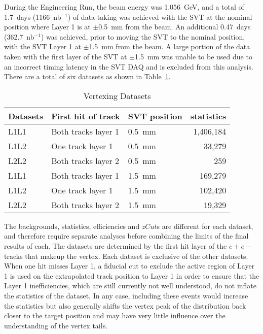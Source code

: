 During the Engineering Run, the beam energy was 1.056~GeV, and a total of 1.7~days (1166~nb$^{-1}$) of data-taking was achieved with the SVT at the nominal position where Layer 1 is at $\pm$0.5~mm from the beam. An additional 0.47~days (362.7~nb$^{-1}$) was achieved, prior to moving the SVT to the nominal position, with the SVT Layer 1 at $\pm$1.5~mm from the beam. A large portion of the data taken with the first layer of the SVT at $\pm$1.5~mm was unable to be used due to an incorrect timing latency in the SVT DAQ and is excluded from this analysis. There are a total of six datasets as shown in Table~\ref{tab:datasets}.

\begin{table}[H]
\caption{Vertexing Datasets}
\label{tab:datasets}
\centering
\begin{tabular}{lllr}
\toprule
Datasets &First hit of track & SVT position & statistics \\
\midrule
L1L1 & Both tracks layer 1 & 0.5~mm & 1,406,184\\
L1L2 & One track layer 1 & 0.5~mm & 33,279\\
L2L2 & Both tracks layer 2 & 0.5~mm & 259\\
L1L1 & Both tracks layer 1 & 1.5~mm & 169,279\\
L1L2 & One track layer 1 & 1.5~mm & 102,420\\
L2L2 & Both tracks layer 2 & 1.5~mm & 19,329\\
\bottomrule
\end{tabular}
\end{table}

The backgrounds, statistics, efficiencies and $zCut$s are different for each dataset, and therefore require separate analyses before combining the limits of the final results of each. The datasets are determined by the first hit layer of the $e+e-$ tracks that makeup the vertex. Each dataset is exclusive of the other datasets. When one hit misses Layer 1, a fiducial cut to exclude the active region of Layer 1 is used on the extrapolated track position to Layer 1 in order to ensure that the Layer 1 inefficiencies, which are still currently not well understood, do not inflate the statistics of the dataset. In any case, including these events would increase the statistics but also generally shifts the vertex peak of the distribution back closer to the target position and may have very little influence over the understanding of the vertex tails. 